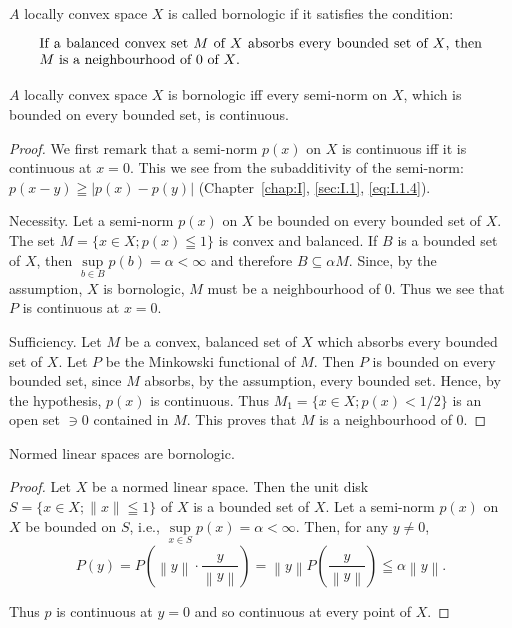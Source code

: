 \begin{definition}\label{def:I.7.Definition.2} $A$ locally convex space $X$ is called bornologic if it satisfies the condition: 

\begin{equation}\label{eq:I.7.1}
\begin{minipage}[b]{0.92\linewidth}
If a balanced convex set $M$ of $X$ absorbs every bounded set of $X$, then $M$ is a neighbourhood of $0$ of $X$.
\end{minipage}
\end{equation}
\end{definition}


\begin{theorem}\label{thm:I.7.Theorem.1} $A$ locally convex space $X$ is bornologic iff every semi-norm on $X$, which is bounded on every bounded set, is continuous. 
\end{theorem}

\begin{proof}
 We first remark that a semi-norm $p(x)$ on $X$ is continuous iff it is continuous at $x = 0$. This we see from the subadditivity of the semi-norm: $p(x- y) \geqq |p(x)- p(y)|$ (Chapter~\ref{chap:I}, \ref{sec:I.1}, \eqref{eq:I.1.4}). 

Necessity. Let a semi-norm $p(x)$ on $X$ be bounded on every bounded set of $X$. The set $M = \{x \in X; p(x) \leqq 1\}$ is convex and balanced. If $B$ is a bounded set of $X$, then $\sup\limits_{b \in B} p(b) = \alpha < \infty$ and therefore $B \subseteq \alpha M$. Since, by the assumption, $X$ is bornologic, $M$ must be a neighbourhood of $0$. Thus we see that $P$ is continuous at $x = 0$. 

Sufficiency. Let $M$ be a convex, balanced set of $X$ which absorbs every bounded set of $X$. Let $P$ be the Minkowski functional of $M$. Then $P$ is bounded on every bounded set, since $M$ absorbs, by the assumption, every bounded set. Hence, by the hypothesis, $p(x)$ is continuous. Thus $M_{1} = \{x \in X; p(x) < 1/2\}$ is an open set $\ni 0$ contained in $M$. This proves that $M$ is a neighbourhood of $0$. 
\end{proof}

\begin{example}\label{ex:I.7.Example.1} Normed linear spaces are bornologic. 
\end{example}

\begin{proof}
 Let $X$ be a normed linear space. Then the unit disk $S = \{x \in X; \| x \| \leqq 1\}$ of $X$ is a bounded set of $X$. Let a semi-norm $p(x)$ on $X$ be bounded on $S$, i.e., $\sup\limits_{x \in S} p(x) = \alpha < \infty$. Then, for any $y \neq 0$, 
\[
P(y) = P\left(\left\| y \right\| \cdot \frac {y}{\left\| y \right\|}\right) = \left\| y \right\| P\left(\frac {y}{\left\| y \right\|}\right) \leqq \alpha \left\| y \right\|. \]

Thus $p$ is continuous at $y = 0$ and so continuous at every point of $X$. 
\end{proof}

